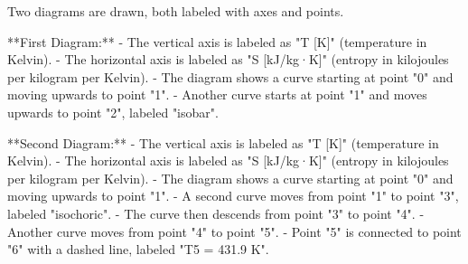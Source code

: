 Two diagrams are drawn, both labeled with axes and points.  

**First Diagram:**  
- The vertical axis is labeled as "T [K]" (temperature in Kelvin).  
- The horizontal axis is labeled as "S [kJ/kg·K]" (entropy in kilojoules per kilogram per Kelvin).  
- The diagram shows a curve starting at point "0" and moving upwards to point "1".  
- Another curve starts at point "1" and moves upwards to point "2", labeled "isobar".  

**Second Diagram:**  
- The vertical axis is labeled as "T [K]" (temperature in Kelvin).  
- The horizontal axis is labeled as "S [kJ/kg·K]" (entropy in kilojoules per kilogram per Kelvin).  
- The diagram shows a curve starting at point "0" and moving upwards to point "1".  
- A second curve moves from point "1" to point "3", labeled "isochoric".  
- The curve then descends from point "3" to point "4".  
- Another curve moves from point "4" to point "5".  
- Point "5" is connected to point "6" with a dashed line, labeled "T5 = 431.9 K".